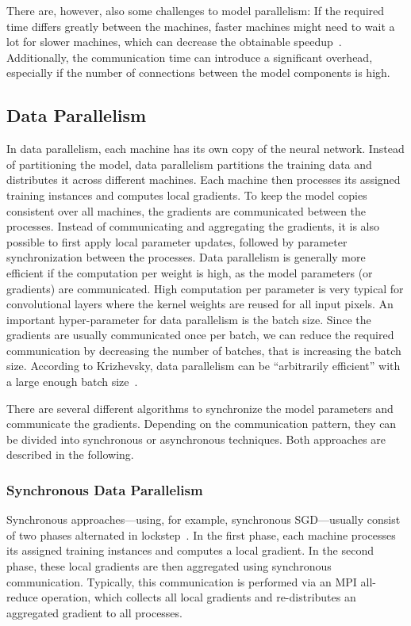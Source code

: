 \documentclass[conference]{IEEEtran}
\begin{document}
There are, however, also some challenges to model parallelism:
If the required time differs greatly between the machines, faster machines might need to wait a lot for slower machines, which can decrease the obtainable speedup~\cite{dean2012-Large-scale-distributed}.
Additionally, the communication time can introduce a significant overhead, especially if the number of connections between the model components is high.


\subsection{Data Parallelism} %
\label{sub:data_parallelism}

In data parallelism, each machine has its own copy of the neural network.
Instead of partitioning the model, data parallelism partitions the training data and distributes it across different machines.
Each machine then processes its assigned training instances and computes local gradients.
To keep the model copies consistent over all machines, the gradients are communicated between the processes.
Instead of communicating and aggregating the gradients, it is also possible to first apply local parameter updates, followed by parameter synchronization between the processes.
%
Data parallelism is generally more efficient if the computation per weight is high, as the model parameters (or gradients) are communicated.
High computation per parameter is very typical for convolutional layers where the kernel weights are reused for all input pixels.
%
An important hyper-parameter for data parallelism is the batch size.
Since the gradients are usually communicated once per batch, we can reduce the required communication by decreasing the number of batches, that is increasing the batch size.
According to Krizhevsky, data parallelism can be ``arbitrarily efficient'' with a large enough batch size~\cite{krizhevsky2014-One-weird-trick}.

There are several different algorithms to synchronize the model parameters and communicate the gradients.
Depending on the communication pattern, they can be divided into synchronous or asynchronous techniques.
Both approaches are described in the following.

\subsubsection{Synchronous Data Parallelism} %
\label{ssub:synchronous_data_parallelism}
Synchronous approaches---using, for example, synchronous SGD---usually consist of two phases alternated in lockstep~\cite{jin2016-How-to-scale}.
In the first phase, each machine processes its assigned training instances and computes a local gradient.
In the second phase, these local gradients are then aggregated using synchronous communication.
Typically, this communication is performed via an MPI all-reduce operation, which collects all local gradients and re-distributes an aggregated gradient to all processes.
\end{document}
